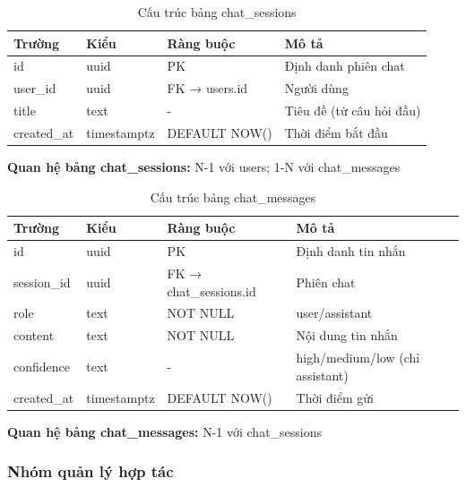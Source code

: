 \vspace{0.3cm}

\begin{table}[H]
\centering
\caption{Cấu trúc bảng chat\_sessions}
\begin{tabular}{|l|l|l|p{5cm}|}
\hline
\textbf{Trường} & \textbf{Kiểu} & \textbf{Ràng buộc} & \textbf{Mô tả} \\
\hline
id & uuid & PK & Định danh phiên chat \\
\hline
user\_id & uuid & FK → users.id & Người dùng \\
\hline
title & text & - & Tiêu đề (từ câu hỏi đầu) \\
\hline
created\_at & timestamptz & DEFAULT NOW() & Thời điểm bắt đầu \\
\hline
\end{tabular}
\end{table}

\noindent\textbf{Quan hệ bảng chat\_sessions:} N-1 với users; 1-N với chat\_messages

\vspace{0.3cm}

\begin{table}[H]
\centering
\caption{Cấu trúc bảng chat\_messages}
\begin{tabular}{|l|l|l|p{4cm}|}
\hline
\textbf{Trường} & \textbf{Kiểu} & \textbf{Ràng buộc} & \textbf{Mô tả} \\
\hline
id & uuid & PK & Định danh tin nhắn \\
\hline
session\_id & uuid & FK → chat\_sessions.id & Phiên chat \\
\hline
role & text & NOT NULL & user/assistant \\
\hline
content & text & NOT NULL & Nội dung tin nhắn \\
\hline
confidence & text & - & high/medium/low (chỉ assistant) \\
\hline
created\_at & timestamptz & DEFAULT NOW() & Thời điểm gửi \\
\hline
\end{tabular}
\end{table}

\noindent\textbf{Quan hệ bảng chat\_messages:} N-1 với chat\_sessions

\vspace{0.5cm}

\subsubsection{Nhóm quản lý hợp tác}

